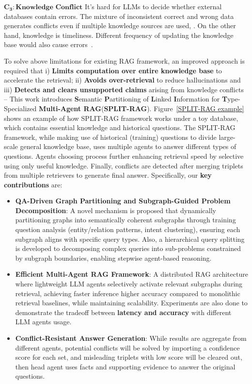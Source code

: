 \documentclass[sigconf]{acmart}
\begin{document}
$\mathbf{C_3}:\textbf{Knowledge Conflict}$ It's hard for LLMs to decide whether external databases contain errors. The mixture of inconsistent correct and wrong data generates conflicts even if multiple knowledge sources are used, . On the other hand, knowledge is timeliness. Different frequency of updating the knowledge base would also cause errors~\cite{fan2024survey}.


To solve above limitations for existing RAG framework, an improved approach is required that i) \textbf{Limits computation over entire knowledge base} to accelerate the retrieval; ii) \textbf{Avoids over-retrieval} to reduce hallucinations and iii) \textbf{Detects and clears unsupported claims} arising from knowledge conflicts -- This work introduces \textbf{S}emantic \textbf{P}artitioning of \textbf{L}inked \textbf{I}nformation for \textbf{T}ype-Specialized \textbf{Multi-Agent RAG}(\textbf{SPLIT-RAG}). Figure~\ref{SPLIT-RAG example} shows an example of how SPLIT-RAG framework works under a toy database, which contains essential knowledge and historical questions. The SPLIT-RAG framework, while making use of historical (training) questions to divide large-scale general knowledge base, uses multiple agents to answer different types of questions. Agents choosing process further enhancing retrieval speed by selective using only useful knowledge. Finally, conflicts are detected after merging triplets from multiple retrievers to generate final answer. Specifically, our \textbf{key contributions} are:

\begin{itemize}
    \item \textbf{QA-Driven Graph Partitioning and Subgraph-Guided Problem Decomposition}: A novel mechanism is proposed that dynamically partitioning graphs into semantically coherent subgraphs through training question analysis (entity/relation patterns, intent clustering), ensuring each subgraph aligns with specific query types. Also, a hierarchical query splitting is developed to decomposing complex queries into sub-problems constrained by subgraph boundaries, enabling stepwise agent-based reasoning.
    
    \item \textbf{Efficient Multi-Agent RAG Framework}: A distributed RAG architecture where lightweight LLM agents selectively activate relevant subgraphs during retrieval, achieving faster inference higher accuracy compared to monolithic retrieval baselines, while maintaining scalability. Experiments are also done to demonstrate the tradeoff between \textbf{latency and accuracy} with different LLM agents usage.
    
    \item \textbf{Conflict-Resistant Answer Generation}: While results are aggregate from different agents, potential conflicts will be solved by importing a confidence score for each set, and misleading triplets with low score will be cleared out, then head agent uses facts and supporting evidence to answer the original questions.
\end{itemize}
\end{document}
